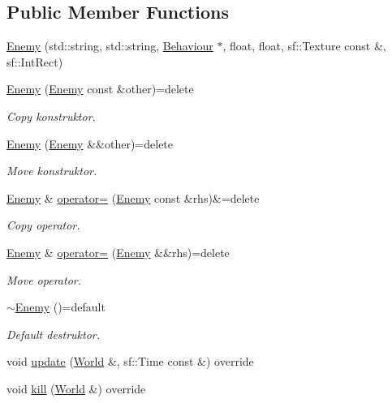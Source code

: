 \subsection*{Public Member Functions}
\begin{DoxyCompactItemize}
\item 
\hyperlink{classEnemy_ae8d63e49373ab8fceaecc652fe489291}{Enemy} (std\+::string, std\+::string, \hyperlink{classBehaviour}{Behaviour} $\ast$, float, float, sf\+::\+Texture const \&, sf\+::\+Int\+Rect)
\item 
\hyperlink{classEnemy_acd0c806f2a8b6383dcfd1f94a59b2c51}{Enemy} (\hyperlink{classEnemy}{Enemy} const \&other)=delete
\begin{DoxyCompactList}\small\item\em Copy konstruktor. \end{DoxyCompactList}\item 
\hyperlink{classEnemy_aab80b7367a9bf32348962adbb80f930b}{Enemy} (\hyperlink{classEnemy}{Enemy} \&\&other)=delete
\begin{DoxyCompactList}\small\item\em Move konstruktor. \end{DoxyCompactList}\item 
\hyperlink{classEnemy}{Enemy} \& \hyperlink{classEnemy_ae1f8ceea084618eb2f18e162c0970fa1}{operator=} (\hyperlink{classEnemy}{Enemy} const \&rhs)\&=delete
\begin{DoxyCompactList}\small\item\em Copy operator. \end{DoxyCompactList}\item 
\hyperlink{classEnemy}{Enemy} \& \hyperlink{classEnemy_adf7f76b8cac299c83f3fed7bcc7fd3b5}{operator=} (\hyperlink{classEnemy}{Enemy} \&\&rhs)=delete
\begin{DoxyCompactList}\small\item\em Move operator. \end{DoxyCompactList}\item 
\hyperlink{classEnemy_aca00fa2f20cea544f52beeb5aa1648f1}{$\sim$\+Enemy} ()=default
\begin{DoxyCompactList}\small\item\em Default destruktor. \end{DoxyCompactList}\item 
void \hyperlink{classEnemy_a257cacd04930ccbfa9545bb5a8dc5be3}{update} (\hyperlink{classWorld}{World} \&, sf\+::\+Time const \&) override
\item 
void \hyperlink{classEnemy_aba8130fd5f8ede411cded7611254ab7a}{kill} (\hyperlink{classWorld}{World} \&) override

\end{DoxyCompactItemize}
